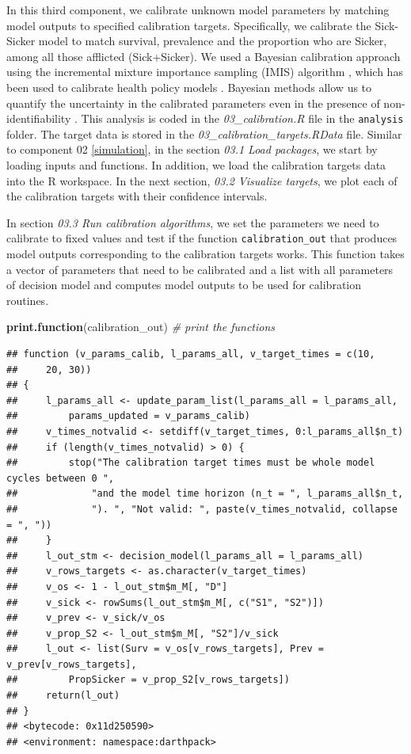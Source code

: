 \documentclass[
]{book}
\newenvironment{Shaded}{\begin{snugshade}}{\end{snugshade}}
\newcommand{\CommentTok}[1]{\textcolor[rgb]{0.56,0.35,0.01}{\textit{#1}}}
\newcommand{\FunctionTok}[1]{\textcolor[rgb]{0.13,0.29,0.53}{\textbf{#1}}}
\newcommand{\NormalTok}[1]{#1}
\begin{document}
In this third component, we calibrate unknown model parameters by matching model outputs to specified calibration targets. Specifically, we calibrate the Sick-Sicker model to match survival, prevalence and the proportion who are Sicker, among all those afflicted (Sick+Sicker). We used a Bayesian calibration approach using the incremental mixture importance sampling (IMIS) algorithm \citep{Steele2006}, which has been used to calibrate health policy models \citep[\citet{Menzies2017}, \citet{Rutter2018}]{Raftery2010}. Bayesian methods allow us to quantify the uncertainty in the calibrated parameters even in the presence of non-identifiability \citep{Alarid-Escudero2018b}. This analysis is coded in the \emph{03\_calibration.R} file in the \texttt{analysis} folder. The target data is stored in the \emph{03\_calibration\_targets.RData} file. Similar to component 02 \ref{simulation}, in the section \emph{03.1 Load packages}, we start by loading inputs and functions. In addition, we load the calibration targets data into the R workspace. In the next section, \emph{03.2 Visualize targets}, we plot each of the calibration targets with their confidence intervals.

In section \emph{03.3 Run calibration algorithms}, we set the parameters we need to calibrate to fixed values and test if the function \texttt{calibration\_out} that produces model outputs corresponding to the calibration targets works. This function takes a vector of parameters that need to be calibrated and a list with all parameters of decision model and computes model outputs to be used for calibration routines.

\begin{Shaded}
\begin{Highlighting}[]
\FunctionTok{print.function}\NormalTok{(calibration\_out) }\CommentTok{\# print the functions}
\end{Highlighting}
\end{Shaded}

\begin{verbatim}
## function (v_params_calib, l_params_all, v_target_times = c(10, 
##     20, 30)) 
## {
##     l_params_all <- update_param_list(l_params_all = l_params_all, 
##         params_updated = v_params_calib)
##     v_times_notvalid <- setdiff(v_target_times, 0:l_params_all$n_t)
##     if (length(v_times_notvalid) > 0) {
##         stop("The calibration target times must be whole model cycles between 0 ", 
##             "and the model time horizon (n_t = ", l_params_all$n_t, 
##             "). ", "Not valid: ", paste(v_times_notvalid, collapse = ", "))
##     }
##     l_out_stm <- decision_model(l_params_all = l_params_all)
##     v_rows_targets <- as.character(v_target_times)
##     v_os <- 1 - l_out_stm$m_M[, "D"]
##     v_sick <- rowSums(l_out_stm$m_M[, c("S1", "S2")])
##     v_prev <- v_sick/v_os
##     v_prop_S2 <- l_out_stm$m_M[, "S2"]/v_sick
##     l_out <- list(Surv = v_os[v_rows_targets], Prev = v_prev[v_rows_targets], 
##         PropSicker = v_prop_S2[v_rows_targets])
##     return(l_out)
## }
## <bytecode: 0x11d250590>
## <environment: namespace:darthpack>
\end{verbatim}
\end{document}

